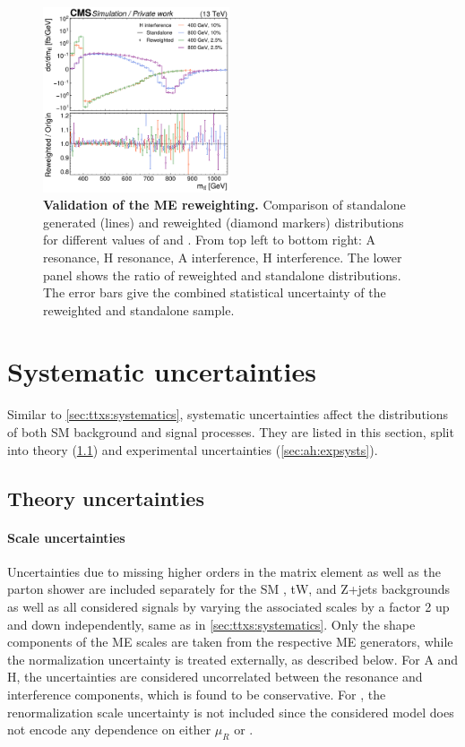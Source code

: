 \begin{figure}[!p]
    \hfill
    \includegraphics[width=0.49\textwidth]{figures/ah/me_reweighting/H_int.pdf}
    \caption{\textbf{Validation of the ME reweighting.} Comparison of standalone generated (lines) and reweighted (diamond markers) \mtt distributions for different values of \mAH and \wAH. From top left to bottom right: A resonance, H resonance, A interference, H interference. The lower panel shows the ratio of reweighted and standalone distributions. The error bars give the combined statistical uncertainty of the reweighted and standalone sample.}
    \label{fig:ah:merew_validation}
\end{figure}

\section{Systematic uncertainties}
\label{sec:ah:systs}

Similar to \cref{sec:ttxs:systematics}, systematic uncertainties affect the distributions of both SM background and signal processes. They are listed in this section, split into theory (\cref{sec:ah:theorysysts}) and experimental uncertainties (\cref{sec:ah:expsysts}).

\subsection{Theory uncertainties}
\label{sec:ah:theorysysts}

\paragraph{Scale uncertainties}
Uncertainties due to missing higher orders in the matrix element as well as the parton shower are included separately for the SM \ttbar, tW, and Z+jets backgrounds as well as all considered signals by varying the associated scales by a factor 2 up and down independently, same as in \cref{sec:ttxs:systematics}. Only the shape components of the ME scales are taken from the respective ME generators, while the normalization uncertainty is treated externally, as described below. For A and H, the uncertainties are considered uncorrelated between the resonance and interference components, which is found to be conservative. For \etat, the renormalization scale uncertainty is not included since the considered model does not encode any dependence on either $\mu_R$ or \alphas.

